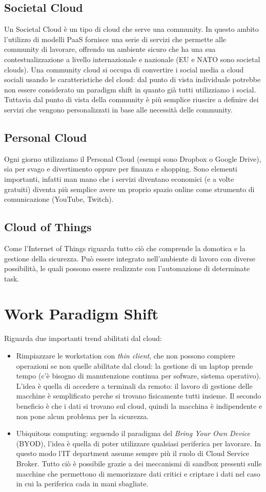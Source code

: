 \subsection{Societal Cloud}
Un Societal Cloud è un tipo di cloud che serve una community. In questo ambito l'utilizzo di modelli PaaS fornisce una serie di servizi che permette alle community di lavorare, offrendo un ambiente sicuro che ha una sua contestualizzazione a livello internazionale e nazionale (EU e NATO sono societal clouds). Una community cloud si occupa di convertire i social media a cloud sociali usando le caratteristiche del cloud: dal punto di vista individuale potrebbe non essere considerato un paradigm shift in quanto già tutti utilizziamo i social. Tuttavia dal punto di vista della community è più semplice riuscire a definire dei servizi che vengono personalizzati in base alle necessità delle community.

\subsection{Personal Cloud}
Ogni giorno utilizziamo il Personal Cloud (esempi sono Dropbox o Google Drive), sia per svago e divertimento oppure per finanza e shopping. Sono elementi importanti, infatti man mano che i servizi diventano economici (e a volte gratuiti) diventa più semplice avere un proprio spazio online come strumento di comunicazione (YouTube, Twitch).
\subsection{Cloud of Things}
Come l'Internet of Things riguarda tutto ciò che comprende la domotica e la gestione della sicurezza. Può essere integrato nell'ambiente di lavoro con diverse possibilità, le quali possono essere realizzate con l'automazione di determinate task.

\section{Work Paradigm Shift}
Riguarda due importanti trend abilitati dal cloud:
\begin{itemize}
    \item Rimpiazzare le workstation con \textit{thin client}, che non possono compiere operazioni se non quelle abilitate dal cloud: la gestione di un laptop prende tempo (c'è bisogno di manutenzione continua per sofware, sistema operativo). L'idea è quella di accedere a terminali da remoto: il lavoro di gestione delle macchine è semplificato perche si trovano fisicamente tutti insieme. Il secondo beneficio è che i dati si trovano sul cloud, quindi la macchina è indipendente e non pone alcun problema per la sicurezza.
    \item Ubiquitous computing: seguendo il paradigma del \textit{Bring Your Own Device} (BYOD), l'idea è quella di poter utilizzare qualsiasi periferica per lavorare. In questo modo l'IT department assume sempre più il ruolo di Cloud Service Broker. Tutto ciò è possibile grazie a dei meccanismi di sandbox presenti sulle macchine che permettono di memorizzare dati critici e criptare i dati nel caso in cui la periferica cada in mani sbagliate.
\end{itemize}

